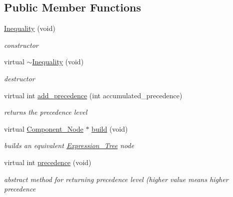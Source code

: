 \subsection*{Public Member Functions}
\begin{DoxyCompactItemize}
\item 
\hyperlink{classMadara_1_1Expression__Tree_1_1Inequality_a7a4146dafd8bd8d17d9e9778d6596140}{Inequality} (void)
\begin{DoxyCompactList}\small\item\em constructor \item\end{DoxyCompactList}\item 
virtual \hyperlink{classMadara_1_1Expression__Tree_1_1Inequality_a413c47d023a0962a9968ee3001e9ce2e}{$\sim$Inequality} (void)
\begin{DoxyCompactList}\small\item\em destructor \item\end{DoxyCompactList}\item 
virtual int \hyperlink{classMadara_1_1Expression__Tree_1_1Inequality_ab02db3f41ea86b7e5067659ce0c2c665}{add\_\-precedence} (int accumulated\_\-precedence)
\begin{DoxyCompactList}\small\item\em returns the precedence level \item\end{DoxyCompactList}\item 
virtual \hyperlink{classMadara_1_1Expression__Tree_1_1Component__Node}{Component\_\-Node} $\ast$ \hyperlink{classMadara_1_1Expression__Tree_1_1Inequality_a87ff250bf3ead79336907a4d881282aa}{build} (void)
\begin{DoxyCompactList}\small\item\em builds an equivalent \hyperlink{classMadara_1_1Expression__Tree_1_1Expression__Tree}{Expression\_\-Tree} node \item\end{DoxyCompactList}\item 
virtual int \hyperlink{classMadara_1_1Expression__Tree_1_1Symbol_ac060dedb8d16864591b259df375109b3}{precedence} (void)
\begin{DoxyCompactList}\small\item\em abstract method for returning precedence level (higher value means higher precedence \item\end{DoxyCompactList}\end{DoxyCompactItemize}
